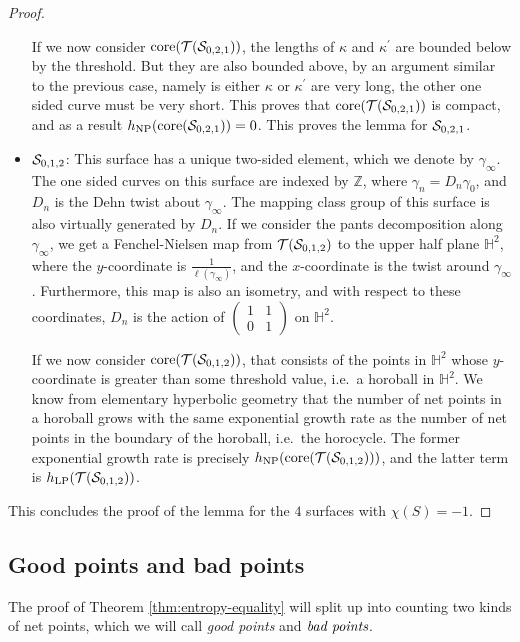 \begin{proof}
\begin{itemize}
    If we now consider $\mathrm{core}(\mathcal{T}(\mathcal{S}_{0,2,1}))$, the lengths of $\kappa$ and $\kappa^{\prime}$ are bounded below by the threshold.
    But they are also bounded above, by an argument similar to the previous case, namely is either $\kappa$ or $\kappa^{\prime}$ are very long, the other one sided curve must be very short.
    This proves that $\mathrm{core}(\mathcal{T}(\mathcal{S}_{0,2,1}))$ is compact, and as a result $h_{\mathrm{NP}}(\mathrm{core}(\mathcal{S}_{0,2,1})) = 0$.
    This proves the lemma for $\mathcal{S}_{0,2,1}$.
  \item $\mathcal{S}_{0,1,2}$: This surface has a unique two-sided element, which we denote by $\gamma_{\infty}$.
    The one sided curves on this surface are indexed by $\mathbb{Z}$, where $\gamma_n = D_n \gamma_0$, and $D_n$ is the Dehn twist about $\gamma_\infty$.
    The mapping class group of this surface is also virtually generated by $D_n$.
    If we consider the pants decomposition along $\gamma_{\infty}$, we get a Fenchel-Nielsen map from $\mathcal{T}(\mathcal{S}_{0,1,2})$ to the upper half plane $\mathbb{H}^2$, where the $y$-coordinate is $\frac{1}{\ell(\gamma_{\infty})}$, and the $x$-coordinate is the twist around $\gamma_{\infty}$.
    Furthermore, this map is also an isometry, and with respect to these coordinates, $D_n$ is the action of $
    \begin{pmatrix}
      1 & 1 \\
      0 & 1
    \end{pmatrix}
    $ on $\mathbb{H}^2$.

    If we now consider $\mathrm{core}(\mathcal{T}(\mathcal{S}_{0,1,2}))$, that consists of the points in $\mathbb{H}^2$ whose $y$-coordinate is greater than some threshold value, i.e.\ a horoball in $\mathbb{H}^2$.
    We know from elementary hyperbolic geometry that the number of net points in a horoball grows with the same exponential growth rate as the number of net points in the boundary of the horoball, i.e.\ the horocycle.
    The former exponential growth rate is precisely $h_{\mathrm{NP}}(\mathrm{core}(\mathcal{T}(\mathcal{S}_{0,1,2})))$, and the latter term is $h_{\mathrm{LP}}(\mathcal{T}(\mathcal{S}_{0,1,2}))$.
  \end{itemize}
  This concludes the proof of the lemma for the $4$ surfaces with $\chi(S) = -1$.
\end{proof}

\subsection{Good points and bad points}
\label{sec:good-points-bad}

The proof of Theorem \ref{thm:entropy-equality} will split up into counting two kinds of net points, which we will call \emph{good points} and $\emph{bad points}$.


